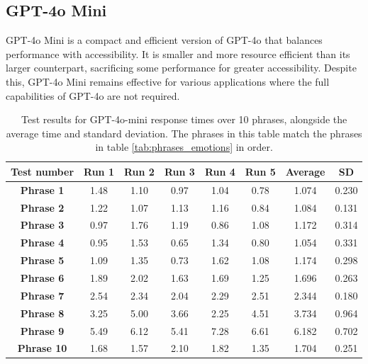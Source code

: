 \subsection{GPT-4o Mini}

GPT-4o Mini is a compact and efficient version of GPT-4o that balances performance with accessibility. It is smaller and more resource efficient than its larger counterpart, sacrificing some performance for greater accessibility. Despite this, GPT-4o Mini remains effective for various applications where the full capabilities of GPT-4o are not required.

\begin{table}[h!]
\centering{}
\caption{Test results for GPT-4o-mini response times over 10 phrases, alongside the average time and standard deviation. The phrases in this table match the phrases in table \ref{tab:phrases_emotions} in order.}
\begin{tabular}{|c|c|c|c|c|c|c|c|}
\hline
\textbf{Test number} & \textbf{Run 1} & \textbf{Run 2} & \textbf{Run 3} & \textbf{Run 4} & \textbf{Run 5} & \textbf{Average} & \textbf{SD} \\ \hline
\textbf{Phrase 1}  & 1.48 & 1.10 & 0.97 & 1.04 & 0.78 & 1.074 & 0.230          \\ \hline
\textbf{Phrase 2}  & 1.22 & 1.07 & 1.13 & 1.16 & 0.84 & 1.084 & 0.131          \\ \hline
\textbf{Phrase 3}  & 0.97 & 1.76 & 1.19 & 0.86 & 1.08 & 1.172 & 0.314          \\ \hline
\textbf{Phrase 4}  & 0.95 & 1.53 & 0.65 & 1.34 & 0.80 & 1.054 & 0.331          \\ \hline
\textbf{Phrase 5}  & 1.09 & 1.35 & 0.73 & 1.62 & 1.08 & 1.174 & 0.298          \\ \hline
\textbf{Phrase 6}  & 1.89 & 2.02 & 1.63 & 1.69 & 1.25 & 1.696 & 0.263          \\ \hline
\textbf{Phrase 7}  & 2.54 & 2.34 & 2.04 & 2.29 & 2.51 & 2.344 & 0.180          \\ \hline
\textbf{Phrase 8}  & 3.25 & 5.00 & 3.66 & 2.25 & 4.51 & 3.734 & 0.964          \\ \hline
\textbf{Phrase 9}  & 5.49 & 6.12 & 5.41 & 7.28 & 6.61 & 6.182 & 0.702          \\ \hline
\textbf{Phrase 10} & 1.68 & 1.57 & 2.10 & 1.82 & 1.35 & 1.704 & 0.251          \\ \hline
\end{tabular}
\label{tab:phrase_gpt4o-mini}
\end{table}

